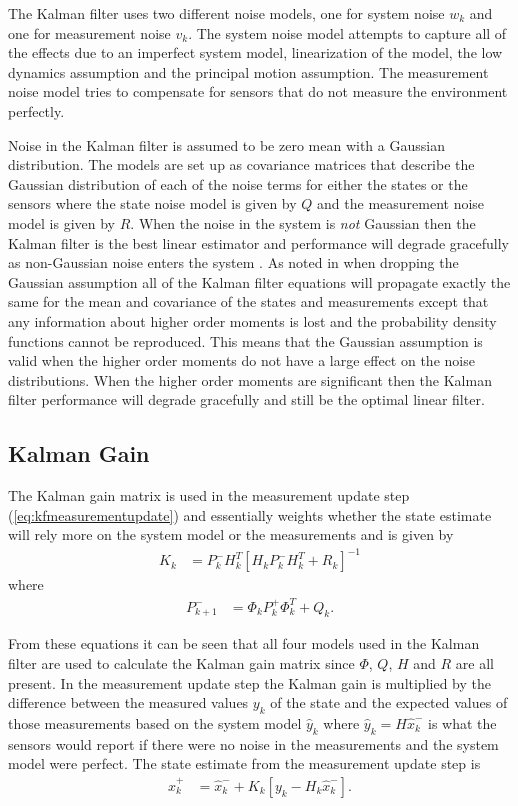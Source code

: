 The Kalman filter uses two different noise models, one for system noise $w_k$ and one for measurement noise $v_k$. The system noise model attempts to capture all of the effects due to an imperfect system model, linearization of the model, the low dynamics assumption and the principal motion assumption. The measurement noise model tries to compensate for sensors that do not measure the environment perfectly.

Noise in the Kalman filter is assumed to be zero mean with a Gaussian distribution. The models are set up as covariance matrices that describe the Gaussian distribution of each of the noise terms for either the states or the sensors where the state noise model is given by $Q$ and the measurement noise model is given by $R$. When the noise in the system is \textit{not} Gaussian then the Kalman filter is the best linear estimator and performance will degrade gracefully as non-Gaussian noise enters the system \cite{Simon10}. As noted in \cite{AndersonMoore79} when dropping the Gaussian assumption all of the Kalman filter equations will propagate exactly the same for the mean and covariance of the states and measurements except that any information about higher order moments is lost and the probability density functions cannot be reproduced. This means that the Gaussian assumption is valid when the higher order moments do not have a large effect on the noise distributions. When the higher order moments are significant then the Kalman filter performance will degrade gracefully and still be the optimal linear filter.

\subsection{Kalman Gain}
\label{kfKalmanGain}
The Kalman gain matrix is used in the measurement update step (\ref{eq:kfmeasurementupdate}) and essentially weights whether the state estimate will rely more on the system model or the measurements and is given by
\begin{align*}
K_k &= P_k^-H_k^T\left[H_kP_k^-H_k^T + R_k\right]^{-1}
\end{align*}
where
\begin{align*}
P_{k+1}^- &= \Phi_kP_k^+\Phi_k^T + Q_k.
\end{align*}

From these equations it can be seen that all four models used in the Kalman filter are used to calculate the Kalman gain matrix since $\Phi$, $Q$, $H$ and $R$ are all present. In the measurement update step the Kalman gain is multiplied by the difference between the measured values $y_k$ of the state and the expected values of those measurements based on the system model $\hat{y}_k$ where $\hat{y}_k = H\hat{x}_k^-$ is what the sensors would report if there were no noise in the measurements and the system model were perfect. The state estimate from the measurement update step is
\begin{align*}
\hat{x}_k^+ &= \hat{x}_k^- + K_k\left[y_k - H_k\hat{x}_k^-\right].
\end{align*}

